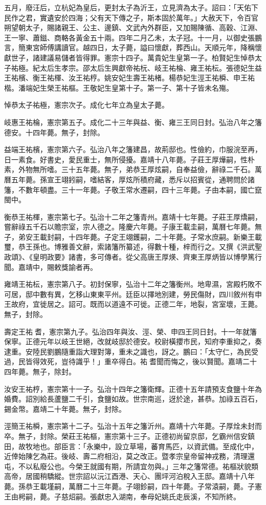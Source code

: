 五月，廢汪后，立杭妃為皇后，更封太子為沂王，立見濟為太子。詔曰：「天佑下民作之君，實遺安於四海；父有天下傳之子，斯本固於萬年。」大赦天下，令百官朔望朝太子，賜諸親王、公主、邊鎮、文武內外群臣，又加賜陳循、高穀、江淵、王一寧、蕭鎡、商輅各黃金五十兩。四年二月乙未，太子冠。十一月，以御史張鵬言，簡東宮師傅講讀官。越四日，太子薨，謚曰懷獻，葬西山。天順元年，降稱懷獻世子，諸建議易儲者皆得罪。憲宗十四子。萬貴妃生皇第一子。柏賢妃生悼恭太子祐極。紀太后生孝宗。邵太后生興獻帝祐杬、岐王祐棆、雍王祐枟。張德妃生益王祐檳、衡王祐楎、汝王祐梈。姚安妃生壽王祐楮。楊恭妃生涇王祐橓、申王祐楷。潘端妃生榮王祐樞。王敬妃生皇第十子。第一子、第十子皆未名殤。

悼恭太子祐極，憲宗次子。成化七年立為皇太子薨。

岐惠王祐棆，憲宗第五子。成化二十三年與益、衡、雍三王同日封。弘治八年之籓德安。十四年薨。無子，封除。

益端王祐檳，憲宗第六子。弘治八年之籓建昌，故荊邸也。性儉約，巾服浣至再，日一素食。好書史，愛民重士，無所侵擾。嘉靖十八年薨。子莊王厚燁嗣，性朴素，外物無所嗜。三十五年薨。無子，弟恭王厚炫嗣，自奉益儉，辭祿二千石。萬曆五年薨。孫宣王翊鈏嗣，嗜結客，厚炫所積府藏，悉斥以招賓從，通聘問於諸籓，不數年頓盡。三十一年薨。子敬王常水遷嗣，四十三年薨。子由本嗣，國亡竄閩中。

衡恭王祐楎，憲宗第七子。弘治十二年之籓青州。嘉靖十七年薨。子莊王厚燆嗣，嘗辭祿五千石以贍宗室，宗人德之。隆慶六年薨。子康王載圭嗣，萬曆七年薨。無子，弟安王載封嗣，十四年薨。子定王翊鑊嗣，二十年薨。子常水庶嗣。新樂王載璽，恭王孫也。博雅善文辭，索諸籓所纂述，得數十種，梓而行之。又撰《洪武聖政頌》、《皇明政要》諸書，多可傳者。從父高唐王厚煐、齊東王厚炳皆以博學篤行聞。嘉靖中，賜敕獎諭者再。

雍靖王祐枟，憲宗第八子。初封保寧，弘治十二年之籓衡州。地卑濕，宮殿朽敗不可居，邸中數有異，乞移山東東平州。廷臣以擇地別建，勞民傷財，四川敘州有申王故府，宜徙居之。詔可。既而以道遠不可徙。正德二年，地裂，宮室壞，王薨。無子，封除。

壽定王祐耆，憲宗第九子。弘治四年與汝、涇、榮、申四王同日封。十一年就籓保寧。正德元年以岐王世絕，改就岐邸於德安。校尉橫攖市民，知府李重抑之，奏逮重。安陸民劉鵬隨重詣大理對簿，重未之識也，訝之。鵬曰：「太守仁，為民受過，民皆得效死，豈待識乎！」重卒得白。祐耆聞而悔之，後以賢聞。嘉靖二十四年薨。無子，除封。

汝安王祐梈，憲宗第十一子。弘治十四年之籓衛輝。正德十五年請預支食鹽十年為婚費。詔別給長蘆鹽二千引，食鹽如故。世宗南巡，迓於途，甚恭。加祿五百石，錫金幣。嘉靖二十年薨。無子，封除。

涇簡王祐橓，憲宗第十二子。弘治十五年之籓沂州。嘉靖十六年薨。子厚烇未封而卒。無子，封除。榮莊王祐樞，憲宗第十三子。正德初尚留京邸，乞霸州信安鎮田，故牧地也。部臣言：「永樂中，設立草場，蕃育馬匹，以資武備。至成化中，近倖始陳乞為莊。後岐、壽二府相沿，莫之改正。暨孝宗皇帝留神戎務，清理還屯，不以私廢公也。今榮王就國有期，所請宜勿與。」三年之籓常德。祐樞狀貌類高帝，居國稍驕縱。世宗詔以沅江酉港、天心、團坪河泊稅入王邸。嘉靖十八年薨。孫恭王載墐嗣，萬曆二十三年薨。子翊鉁嗣，四十年薨。子常溒嗣，薨。子憲王由枵嗣，薨。子慈炤嗣。張獻忠入湖南，奉母妃姚氏走辰溪，不知所終。

